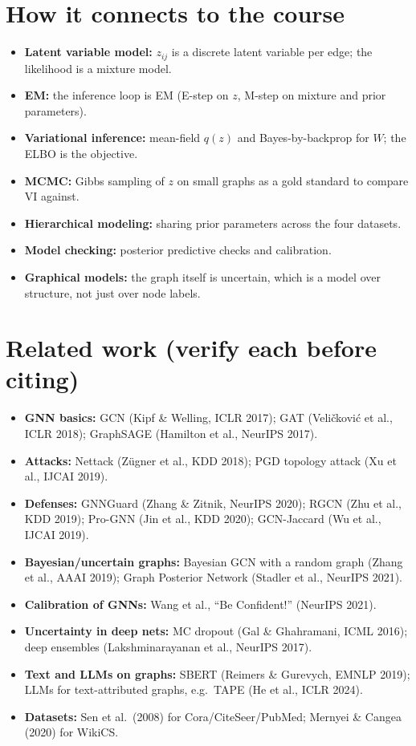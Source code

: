 \documentclass[11pt]{article}
\begin{document}
\section{How it connects to the course}
\begin{itemize}
  \item \textbf{Latent variable model:} $z_{ij}$ is a discrete latent variable per edge;
        the likelihood is a mixture model.
  \item \textbf{EM:} the inference loop is EM (E-step on $z$, M-step on mixture and prior
        parameters).
  \item \textbf{Variational inference:} mean-field $q(z)$ and Bayes-by-backprop for $W$; the
        ELBO is the objective.
  \item \textbf{MCMC:} Gibbs sampling of $z$ on small graphs as a gold standard to compare
        VI against.
  \item \textbf{Hierarchical modeling:} sharing prior parameters across the four datasets.
  \item \textbf{Model checking:} posterior predictive checks and calibration.
  \item \textbf{Graphical models:} the graph itself is uncertain, which is a model over
        structure, not just over node labels.
\end{itemize}

\section{Related work (verify each before citing)}
\begin{itemize}
  \item \textbf{GNN basics:} GCN (Kipf \& Welling, ICLR 2017); GAT (Veli\v{c}kovi\'c et al.,
        ICLR 2018); GraphSAGE (Hamilton et al., NeurIPS 2017).
  \item \textbf{Attacks:} Nettack (Z\"ugner et al., KDD 2018); PGD topology attack (Xu et
        al., IJCAI 2019).
  \item \textbf{Defenses:} GNNGuard (Zhang \& Zitnik, NeurIPS 2020); RGCN (Zhu et al., KDD
        2019); Pro-GNN (Jin et al., KDD 2020); GCN-Jaccard (Wu et al., IJCAI 2019).
  \item \textbf{Bayesian/uncertain graphs:} Bayesian GCN with a random graph (Zhang et al.,
        AAAI 2019); Graph Posterior Network (Stadler et al., NeurIPS 2021).
  \item \textbf{Calibration of GNNs:} Wang et al., ``Be Confident!'' (NeurIPS 2021).
  \item \textbf{Uncertainty in deep nets:} MC dropout (Gal \& Ghahramani, ICML 2016); deep
        ensembles (Lakshminarayanan et al., NeurIPS 2017).
  \item \textbf{Text and LLMs on graphs:} SBERT (Reimers \& Gurevych, EMNLP 2019); LLMs for
        text-attributed graphs, e.g.\ TAPE (He et al., ICLR 2024).
  \item \textbf{Datasets:} Sen et al.\ (2008) for Cora/CiteSeer/PubMed; Mernyei \& Cangea
        (2020) for WikiCS.
\end{itemize}
\end{document}
